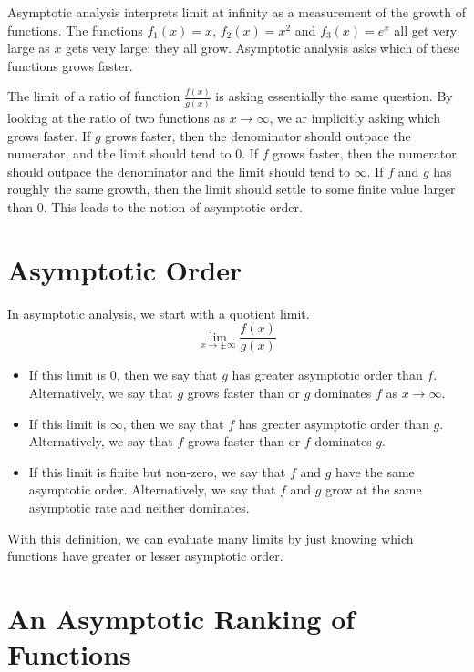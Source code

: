 \documentclass[fleqn]{report}
\begin{document}
Asymptotic analysis interprets limit at infinity
as a measurement of the growth of functions. The functions
$f_1(x) = x$, $f_2(x) = x^2$ and $f_3(x) = e^x$ all get very large as
$x$ gets very large; they all grow. Asymptotic analysis asks
which of these functions grows faster. 

The limit of a ratio of function $\frac{f(x)}{g(x)}$ is asking
essentially the same question. By looking at the ratio of two
functions as $x \rightarrow \infty$, we ar implicitly asking
which grows faster. If $g$ grows faster, then the denominator
should outpace the numerator, and the limit should tend to
$0$. If $f$ grows faster, then the numerator should outpace
the denominator and the limit should tend to $\infty$. If $f$
and $g$ has roughly the same growth, then the limit should
settle to some finite value larger than $0$. This leads to
the notion of asymptotic order.

\section*{Asymptotic Order}

In asymptotic analysis, we start with a quotient limit.
\begin{equation*}
\lim_{x \rightarrow \pm \infty} \frac{f(x)}{g(x)}
\end{equation*}
\begin{itemize}
\item If this limit is $0$, then we say that $g$ has greater
asymptotic order than $f$. Alternatively, we say that $g$ grows
faster than or $g$ dominates $f$ as $x \rightarrow \infty$. 
\item If this limit is $\infty$, then we say that $f$ has
greater asymptotic order than $g$. Alternatively, we say that
$f$ grows faster than or $f$ dominates $g$.
\item If this limit is finite but non-zero, we say that $f$ and
$g$ have the same asymptotic order. Alternatively, we say that
$f$ and $g$ grow at the same asymptotic rate and neither
dominates.
\end{itemize}
With this definition, we can evaluate many limits by just
knowing which functions have greater or lesser asymptotic
order.

\section*{An Asymptotic Ranking of Functions}
\end{document}
